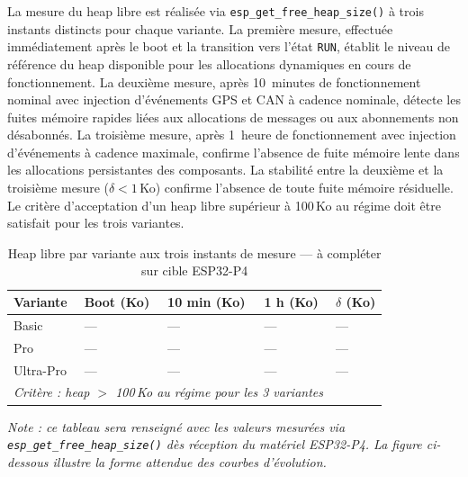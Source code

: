 La mesure du heap libre est réalisée via \texttt{esp\_get\_free\_heap\_size()}
à trois instants distincts pour chaque variante. La première mesure,
effectuée immédiatement après le boot et la transition vers l'état
\texttt{RUN}, établit le niveau de référence du heap disponible pour
les allocations dynamiques en cours de fonctionnement. La deuxième
mesure, après 10~minutes de fonctionnement nominal avec injection
d'événements GPS et CAN à cadence nominale, détecte les fuites
mémoire rapides liées aux allocations de messages ou aux abonnements
non désabonnés. La troisième mesure, après 1~heure de fonctionnement
avec injection d'événements à cadence maximale, confirme l'absence
de fuite mémoire lente dans les allocations persistantes des composants.
La stabilité entre la deuxième et la troisième mesure ($\delta <
1$\,Ko) confirme l'absence de toute fuite mémoire résiduelle. Le
critère d'acceptation d'un heap libre supérieur à 100\,Ko au régime
doit être satisfait pour les trois variantes.

\begin{table}[H]
\centering
\renewcommand{\arraystretch}{1.5}
\caption{Heap libre par variante aux trois instants de mesure — à compléter sur cible ESP32-P4}
\label{tab:heap_measures}
\small
\begin{tabular}{|p{3.0cm}|p{2.5cm}|p{2.5cm}|p{2.5cm}|p{1.8cm}|}
\hline
\rowcolor{gray!20}
\textbf{Variante} & \textbf{Boot (Ko)} & \textbf{10 min (Ko)} & \textbf{1 h (Ko)} & \textbf{$\delta$ (Ko)} \\
\hline
Basic     & — & — & — & — \\
\hline
Pro       & — & — & — & — \\
\hline
Ultra-Pro & — & — & — & — \\
\hline
\multicolumn{4}{|l|}{\textit{Critère : heap $>$ 100\,Ko au régime pour les 3 variantes}} & \\
\hline
\end{tabular}
\end{table}

\noindent\textit{Note : ce tableau sera renseigné avec les valeurs
mesurées via \texttt{esp\_get\_free\_heap\_size()} dès réception
du matériel ESP32-P4. La figure ci-dessous illustre la forme attendue
des courbes d'évolution.}


